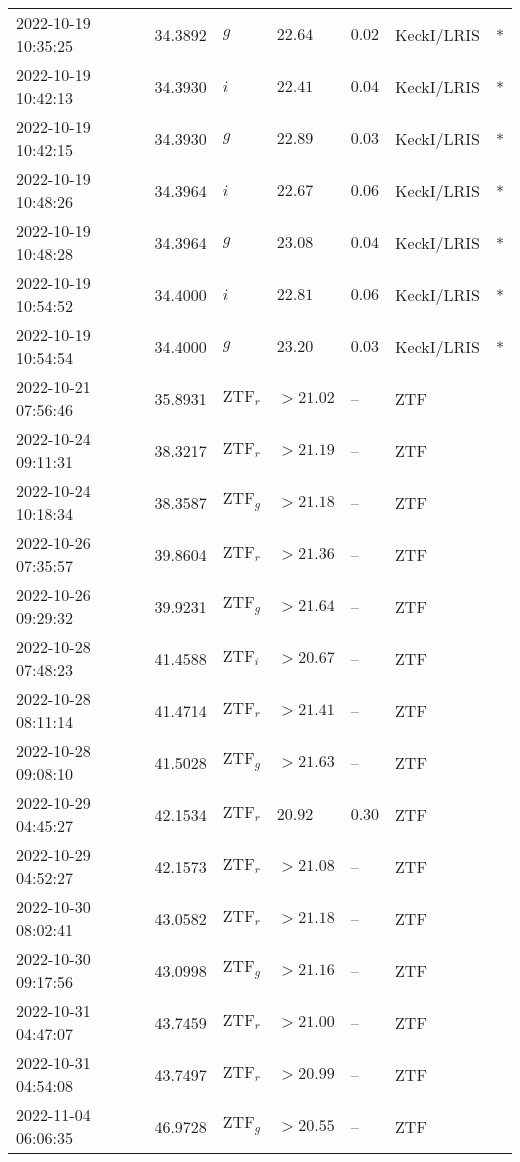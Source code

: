 \documentclass{nature_plusfigure}
\begin{document}
\begin{supplement}
\begin{center}
\begin{longtable}{lllllll}
2022-10-19 10:35:25 & 34.3892 & $g$ & $22.64$ & $0.02$ & KeckI/LRIS & * \\ 
2022-10-19 10:42:13 & 34.3930 & $i$ & $22.41$ & $0.04$ & KeckI/LRIS & * \\ 
2022-10-19 10:42:15 & 34.3930 & $g$ & $22.89$ & $0.03$ & KeckI/LRIS & * \\ 
2022-10-19 10:48:26 & 34.3964 & $i$ & $22.67$ & $0.06$ & KeckI/LRIS & * \\ 
2022-10-19 10:48:28 & 34.3964 & $g$ & $23.08$ & $0.04$ & KeckI/LRIS & * \\ 
2022-10-19 10:54:52 & 34.4000 & $i$ & $22.81$ & $0.06$ & KeckI/LRIS & * \\ 
2022-10-19 10:54:54 & 34.4000 & $g$ & $23.20$ & $0.03$ & KeckI/LRIS & * \\ 
2022-10-21 07:56:46 & 35.8931 & $\mathrm{ZTF}_{r}$ & $>21.02$ & -- & ZTF &  \\ 
2022-10-24 09:11:31 & 38.3217 & $\mathrm{ZTF}_{r}$ & $>21.19$ & -- & ZTF &  \\ 
2022-10-24 10:18:34 & 38.3587 & $\mathrm{ZTF}_{g}$ & $>21.18$ & -- & ZTF &  \\ 
2022-10-26 07:35:57 & 39.8604 & $\mathrm{ZTF}_{r}$ & $>21.36$ & -- & ZTF &  \\ 
2022-10-26 09:29:32 & 39.9231 & $\mathrm{ZTF}_{g}$ & $>21.64$ & -- & ZTF &  \\ 
2022-10-28 07:48:23 & 41.4588 & $\mathrm{ZTF}_{i}$ & $>20.67$ & -- & ZTF &  \\ 
2022-10-28 08:11:14 & 41.4714 & $\mathrm{ZTF}_{r}$ & $>21.41$ & -- & ZTF &  \\ 
2022-10-28 09:08:10 & 41.5028 & $\mathrm{ZTF}_{g}$ & $>21.63$ & -- & ZTF &  \\ 
2022-10-29 04:45:27 & 42.1534 & $\mathrm{ZTF}_{r}$ & $20.92$ & $0.30$ & ZTF &  \\ 
2022-10-29 04:52:27 & 42.1573 & $\mathrm{ZTF}_{r}$ & $>21.08$ & -- & ZTF &  \\ 
2022-10-30 08:02:41 & 43.0582 & $\mathrm{ZTF}_{r}$ & $>21.18$ & -- & ZTF &  \\ 
2022-10-30 09:17:56 & 43.0998 & $\mathrm{ZTF}_{g}$ & $>21.16$ & -- & ZTF &  \\ 
2022-10-31 04:47:07 & 43.7459 & $\mathrm{ZTF}_{r}$ & $>21.00$ & -- & ZTF &  \\ 
2022-10-31 04:54:08 & 43.7497 & $\mathrm{ZTF}_{r}$ & $>20.99$ & -- & ZTF &  \\ 
2022-11-04 06:06:35 & 46.9728 & $\mathrm{ZTF}_{g}$ & $>20.55$ & -- & ZTF &  \\ 

\end{longtable}
\end{center}
\end{supplement}
\end{document}
